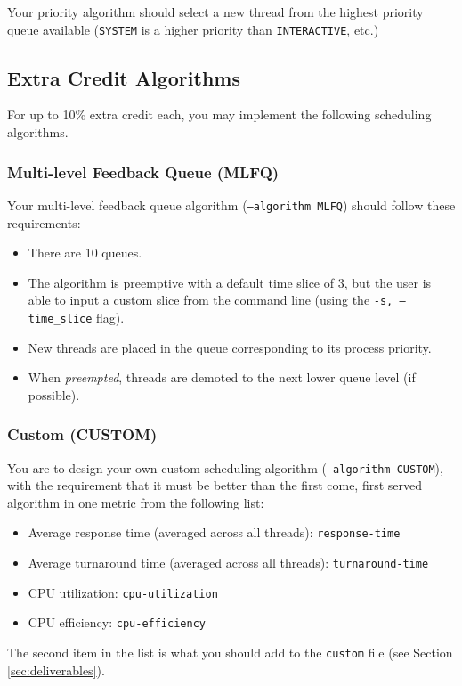\documentclass[main.tex]{subfiles}
\begin{document}
Your priority algorithm should select a new thread from the highest priority queue available (\texttt{SYSTEM} is a higher priority than \texttt{INTERACTIVE}, etc.)

\subsection{Extra Credit Algorithms}
For up to 10\% extra credit each, you may implement the following scheduling algorithms.

\subsubsection{Multi-level Feedback Queue (MLFQ)}
Your multi-level feedback queue algorithm (\texttt{--algorithm MLFQ}) should follow these requirements:

\begin{itemize}
    \item There are 10 queues.
    \item The algorithm is preemptive with a default time slice of 3, but the user is able to input a custom slice from the command line (using the \texttt{-s, --time\_slice} flag).
    \item New threads are placed in the queue corresponding to its process priority.
    \item When \emph{preempted}, threads are demoted to the next lower queue level (if possible).
\end{itemize}

\subsubsection{Custom (CUSTOM)}
You are to design your own custom scheduling algorithm (\texttt{--algorithm CUSTOM}), with the requirement that it must be better than the first come, first served algorithm in one metric from the following list:

\begin{itemize}
    \item Average response time (averaged across all threads): \texttt{response-time}
    \item Average turnaround time (averaged across all threads): \texttt{turnaround-time}
    \item CPU utilization: \texttt{cpu-utilization}
    \item CPU efficiency: \texttt{cpu-efficiency}
\end{itemize}

The second item in the list is what you should add to the \texttt{custom} file (see Section \ref{sec:deliverables}).
\end{document}
